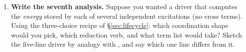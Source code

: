 \begin{enumerate}[nosep]
  use the carry it produced (the new $\vr'$, $\vp'$, and $\beta'=\inner{\vr'}{\vr'}$),
  take  to be the previous step's $\beta=\tfrac12$, and run
   line by line to compute the new direction, step length,
  iterate, and residual. Confirm the residual norm continues to fall, and name the CG
  formula each line implements.
  \item \textbf{Write the seventh analysis.} Suppose you wanted a driver that computes
  the \emph{energy} stored by each of several independent excitations (no cross terms).
  Using the three-choice recipe of \S\ref{sec:lifecycle}: which coordination shape would
  you pick, which reduction verb, and what term list would  take?
  Sketch the five-line driver by analogy with , and say which one
  line differs from it.
\end{enumerate}
